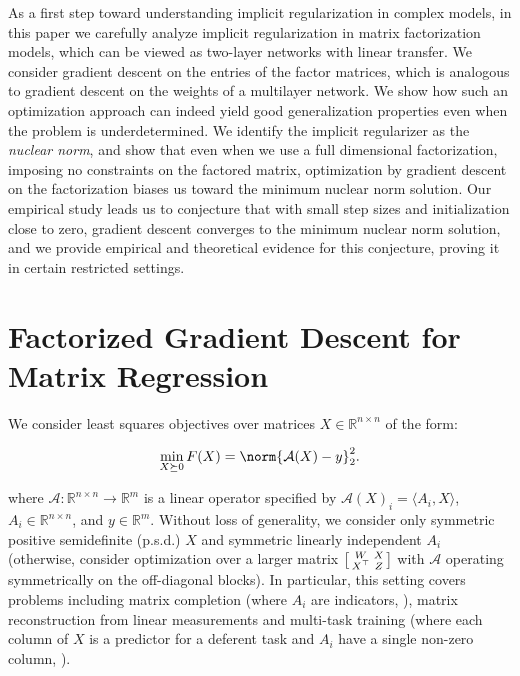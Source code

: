 As a first step toward understanding implicit regularization in complex models, in this paper we carefully analyze implicit regularization in matrix factorization models, which can be viewed as two-layer networks with linear transfer.  We consider gradient descent on the entries of the factor matrices, which is analogous to gradient descent on the weights of a multilayer network.  We show how such an optimization approach can indeed yield good generalization properties even when the problem is underdetermined. We identify the implicit regularizer as the {\em nuclear norm}, and show that even when we use a full dimensional factorization, imposing no constraints on the factored matrix, optimization by gradient descent on the factorization biases us toward the minimum nuclear norm solution.  Our empirical study leads us to conjecture that with small step sizes and initialization close to zero, gradient descent converges to the minimum nuclear norm solution, and we provide empirical and theoretical evidence for this conjecture, proving it in certain restricted settings.

\section{Factorized Gradient Descent for Matrix Regression}\label{sec:gd}
We consider least squares objectives over matrices $X\in\mathbb{R}^{n\times
  n}$ of the form:

\begin{equation}
\min_{X \succeq 0} F(X)=\norm{\mathcal{A}(X)-y}_2^2. 
\label{eq:lstsq}
\end{equation}

where $\mathcal{A}:\mathbb{R}^{n\times n}\to \mathbb{R}^m$ is a linear operator specified by $\mathcal{A}(X)_i=\langle A_i,X \rangle$, $A_i\in\mathbb{R}^{n\times n}$, and $y\in\mathbb{R}^m$.  Without loss of generality, we consider only symmetric positive semidefinite (p.s.d.) $X$ and symmetric linearly independent $A_i$ (otherwise, consider optimization over a larger matrix $

\begin{bsmallmatrix}W & X\\ X^\top& Z\end{bsmallmatrix}

$ with $\mathcal{A}$
operating symmetrically  on the off-diagonal blocks). In particular, this setting covers problems including matrix completion (where $A_i$ are indicators,  
\citet{candes2009exact}), matrix reconstruction from linear measurements \citep{recht2010guaranteed} and multi-task training (where each column of $X$ is a predictor for a deferent task and $A_i$ have a single non-zero column, \citet{argyriou2007multi,amit2007uncovering}).

